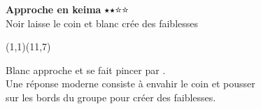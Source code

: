 \documentclass[preview, border=0pt, varwidth=false]{standalone}
\begin{document}
	\setgounit{0.6cm} 
	
\parbox[c][14.65cm][c]{10.2cm}{
	\centering
	
	{\Large\textbf{Approche en keima} 	$\medblackstar \medblackstar \medwhitestar \medwhitestar$ \\ Noir laisse le coin et blanc crée des faiblesses}
	\vspace{3em}
	
	\begin{psgopartialboard}{(1,1)(11,7)}
		\pass
	\end{psgopartialboard}
	
	\vspace{1em}
	Blanc approche et se fait pincer par . \\ Une réponse moderne consiste à envahir le coin et pousser \\ sur les bords du groupe pour créer des faiblesses.
}
\end{document}

